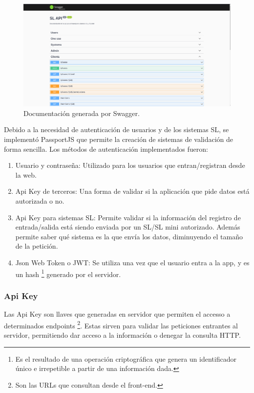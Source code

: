 \begin{figure}[bth]
    \centering
    \includegraphics[width=\textwidth]{imgs/server/swagger.png}
    \caption{Documentación generada por Swagger.}
    \label{fig:swagger-example}
\end{figure}

Debido a la necesidad de autenticación de usuarios y de los sistemas SL, se implementó PassportJS que permite la creación de sistemas de validación de forma sencilla. Los métodos de autenticación implementados fueron:

\begin{enumerate}
    \item Usuario y contraseña: Utilizado para los usuarios que entran/registran desde la web.
    \item Api Key de terceros: Una forma de validar si la aplicación que pide datos está autorizada o no.
    \item Api Key para sistemas SL: Permite validar si la información del registro de entrada/salida está siendo enviada por un SL/SL mini autorizado. Además permite saber qué sistema es la que envía los datos, diminuyendo el tamaño de la petición.
    \item Json Web Token o JWT: Se utiliza una vez que el usuario entra a la app, y es un
          hash \footnote{Es el resultado de una operación criptográfica que genera un identificador único e irrepetible a partir de una información dada.}
          generado por el servidor.
\end{enumerate}

\subsubsection{Api Key}

Las Api Key son llaves que generadas en servidor que permiten el accesso a determinados
endpoints \footnote{Son las URLs que consultan desde el front-end.}.
Estas sirven para validar las peticiones entrantes al servidor, permitiendo dar acceso a la información o denegar la consulta HTTP.

